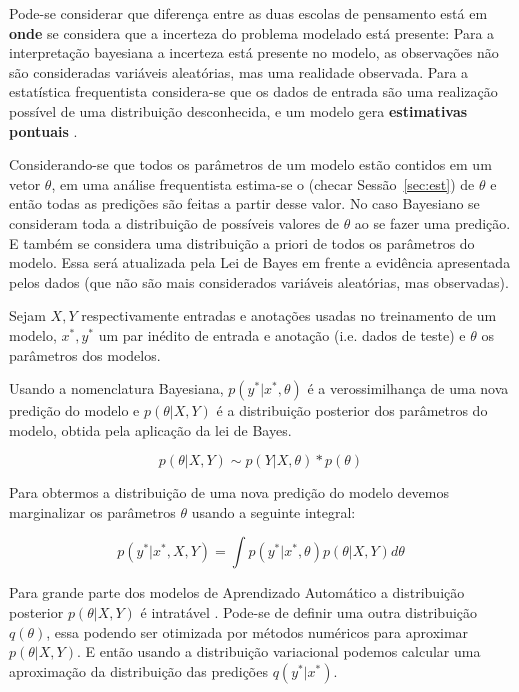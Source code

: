 Pode-se considerar que diferença entre as duas escolas de pensamento está em
\textbf{onde} se considera que a incerteza do problema modelado está presente: Para a
interpretação bayesiana a incerteza está presente no modelo, as observações não
são consideradas variáveis aleatórias, mas uma realidade observada. Para a estatística frequentista
considera-se que os dados de entrada são uma realização possível de uma
distribuição desconhecida, e um modelo gera \textbf{estimativas pontuais} \citep{rethink}.

Considerando-se que todos os parâmetros de um modelo estão contidos em um vetor
$\theta$, em uma análise frequentista estima-se o  (checar Sessão~\ref{sec:est}) de $\theta$ e então todas as
predições são feitas a partir desse valor. No caso Bayesiano se consideram toda
a distribuição de possíveis valores de $\theta$ ao se fazer uma predição. E
também se considera uma distribuição a priori de todos os parâmetros do modelo.
Essa será atualizada pela Lei de Bayes em frente a evidência apresentada pelos
dados (que não são mais considerados variáveis aleatórias, mas observadas).

Sejam $X,Y$ respectivamente entradas e anotações usadas no treinamento de um modelo,
$x^*,y^*$ um par inédito de entrada e anotação (i.e. dados de teste) e
$\theta$ os parâmetros dos modelos.

Usando a nomenclatura Bayesiana, $p(y^* | x^*,\theta)$ é a verossimilhança de
uma nova predição do modelo e $p(\theta | X,Y)$ é a distribuição posterior dos
parâmetros do modelo, obtida pela aplicação da lei de Bayes.

\[
  p(\theta | X,Y) \sim p(Y | X,\theta) * p(\theta)
\]


Para obtermos a distribuição de uma nova predição do modelo devemos marginalizar os parâmetros $\theta$ usando a seguinte integral:

\begin{equation}
  \label{eq:int}
  p(y^* | x^* , X,Y) = \int  p(y^* | x^*,\theta) p(\theta | X,Y)  d\theta 
\end{equation}

Para grande parte dos modelos de Aprendizado Automático a distribuição posterior
$p(\theta | X,Y)$ é intratável \citep{ubertime}. Pode-se de definir uma outra
distribuição $q(\theta)$, essa podendo ser otimizada por métodos numéricos para
aproximar $p(\theta | X,Y)$. E então usando a distribuição variacional podemos
calcular uma aproximação da distribuição das predições $q(y^*|x^*)$. 

